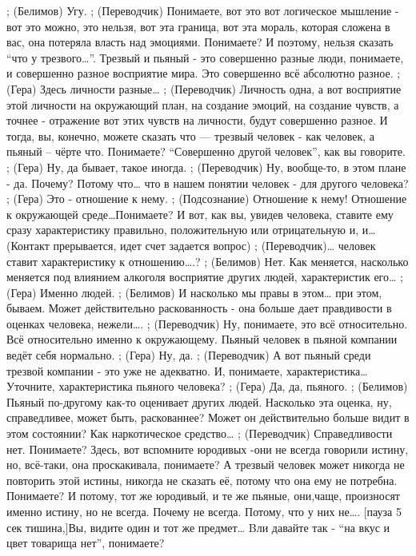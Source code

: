 ;	(Белимов) Угу.
;	(Переводчик) Понимаете, вот это вот логическое мышление - вот это можно, это нельзя, вот эта граница, вот эта мораль, которая сложена в вас, она потеряла власть над эмоциями. Понимаете? И поэтому, нельзя сказать ``что у трезвого…''. Трезвый и пьяный - это совершенно разные люди, понимаете, и совершенно разное восприятие мира. Это совершенно всё абсолютно разное. 
;	(Гера) Здесь личности разные…
;	(Переводчик) Личность одна, а вот восприятие этой личности на окружающий план, на создание эмоций, на создание чувств, а точнее - отражение  вот этих чувств на личности, будут совершенно разное. И тогда, вы, конечно, можете сказать что — трезвый человек - как человек, а пьяный – чёрте что. Понимаете? ``Совершенно другой человек'', как вы говорите.
;	(Гера) Ну, да бывает, такое иногда.
;	(Переводчик) Ну, вообще-то, в этом плане - да. Почему? Потому что… что в нашем понятии человек - для другого человека?
;	(Гера) Это - отношение к нему.
;	(Подсознание) Отношение к нему! Отношение к окружающей среде…Понимаете? И вот, как вы, увидев человека, ставите ему сразу характеристику правильно, положительную или отрицательную и, и…
(Контакт прерывается, идет счет задается вопрос)
;	(Переводчик)… человек ставит характеристику к отношению….?
;	(Белимов) Нет. Как меняется, насколько меняется под влиянием алкоголя восприятие других людей, характеристик его…
;	(Гера) Именно людей.
;	(Белимов) И насколько мы правы в этом… при этом, бываем. Может действительно раскованность - она больше дает правдивости в оценках человека, нежели….
;	(Переводчик) Ну, понимаете, это всё относительно. Всё относительно именно к окружающему. Пьяный человек в пьяной компании ведёт себя нормально.
;	(Гера) Ну, да.
;	(Переводчик) А вот пьяный среди трезвой компании - это уже не адекватно. И, понимаете, характеристика… Уточните, характеристика пьяного человека?
;	(Гера) Да, да, пьяного.
;	(Белимов) Пьяный по-другому как-то оценивает других людей. Насколько эта оценка, ну, справедливее, может быть, раскованнее? Может он действительно больше видит в этом состоянии? Как наркотическое средство…
;	(Переводчик) Справедливости нет. Понимаете? Здесь, вот вспомните юродивых -они не всегда говорили истину, но, всё-таки, она проскакивала, понимаете? А трезвый человек может никогда не повторить этой истины, никогда не сказать её, потому что она ему не потребна. Понимаете? И потому, тот же юродивый, и те же пьяные, они,чаще, произносят именно истину, но не всегда. Почему не всегда.   Потому, что у них не…. [пауза 5 сек тишина,]Вы, видите один и тот же предмет… Bли давайте так  - ``на вкус и цвет товарища нет'', понимаете?
